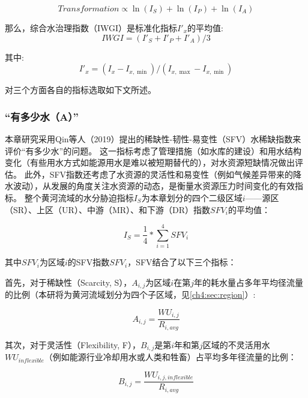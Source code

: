 \begin{equation}
    Transformation \propto \ln(I_S) + \ln(I_P) + \ln(I_A)
\end{equation}

那么，综合水治理指数（IWGI）是标准化指标$I'_x$的平均值:
\begin{equation}
    IWGI = (I'_S + I'_P + I'_A) / 3
\end{equation}

其中:
\begin{equation}
    I'_x = (I_x - I_{x, \min}) / (I_{x, \max} - I_{x, \min})
\end{equation}

对三个方面各自的指标选取如下文所述。

\subsubsection*{“有多少水（A）”}

本章研究采用Qin等人（2019）提出的稀缺性-韧性-易变性（SFV）水稀缺指数来评价“有多少水”的问题\cite{qin2019}。
这一指标考虑了管理措施（如水库的建设）和用水结构变化（有些用水方式如能源用水是难以被短期替代的），对水资源短缺情况做出评估。
此外，SFV指数还考虑了水资源的灵活性和易变性（例如气候差异带来的降水波动），从发展的角度关注水资源的动态，是衡量水资源压力\cite{qin2019}时间变化的有效指标。
整个黄河流域的水分胁迫指标$I_S$为本章划分的四个二级区域$i$——源区（SR）、上区（UR）、中游（MR）、和下游（DR）指数$SFV_{i}$的平均值：

\begin{equation}
    I_S = \frac{1}{4} * \sum_{i=1}^4 SFV_{i}
\end{equation}

其中$SFV_i$为区域$i$的SFV指数$SFV_i$，SFV结合了以下三个指标：

首先，对于稀缺性（Scarcity, S），$A_{i, j}$为区域$i$在第$j$年的耗水量占多年平均径流量的比例（本研将为黄河流域划分为四个子区域，见\ref{ch4:sec:region}）:

\begin{equation}
    A_{i, j} = \frac{WU_{i,j}}{R_{i, avg}}
\end{equation}

其次，对于灵活性（Flexibility, F），$B_{i, j}$是第$i$年和第$j$区域的不灵活用水$WU_{inflexible}$（例如能源行业冷却用水或人类和牲畜）占平均多年径流量的比例：

\begin{equation}
    B_{i, j} = \frac{WU_{i, j, inflexible}}{R_{i, avg}}
\end{equation}

